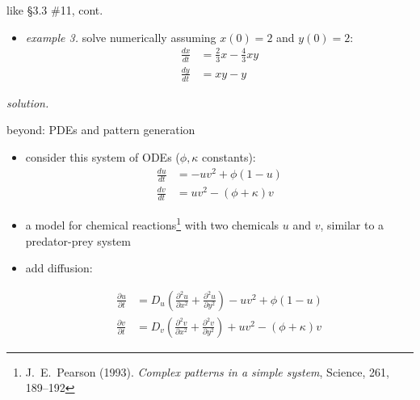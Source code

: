 \documentclass[urlcolor=blue,dvipsnames]{beamer}
\begin{document}
\begin{frame}{like \S3.3 \#11, cont.}

\begin{itemize}
\item \emph{example 3.}  solve numerically assuming $x(0)=2$ and $y(0)=2$:
\begin{align*}
\frac{dx}{dt} &= \frac{2}{3} x - \frac{4}{3} xy \\
\frac{dy}{dt} &= xy - y
\end{align*}
\end{itemize}

\noindent \emph{solution.}


\end{frame}


\begin{frame}{beyond: PDEs and pattern generation}

\small
\begin{itemize}
\item consider this system of ODEs ($\phi,\kappa$ constants):
\scriptsize
\begin{align*}
\frac{du}{dt} &= -uv^2+\phi(1-u) \\
\frac{dv}{dt} &= uv^2-(\phi+\kappa)v
\end{align*}
\small
\item a model for chemical reactions\footnote{\tiny J.~E.~Pearson (1993). \emph{Complex patterns in a simple system}, Science, 261, 189--192} with two chemicals $u$ and $v$, similar to a predator-prey system
\item add diffusion:

\vspace{-10mm}
\scriptsize
\begin{align*}
\frac{\partial u}{\partial t} &= D_u \left(\frac{\partial^2 u}{\partial x^2} + \frac{\partial^2 u}{\partial y^2}\right) -uv^2+\phi(1-u) \\
\frac{\partial v}{\partial t} &= D_v \left(\frac{\partial^2 v}{\partial x^2} + \frac{\partial^2 v}{\partial y^2}\right) + uv^2-(\phi+\kappa)v
\end{align*}
\small
\end{itemize}


\end{frame}
\end{document}
